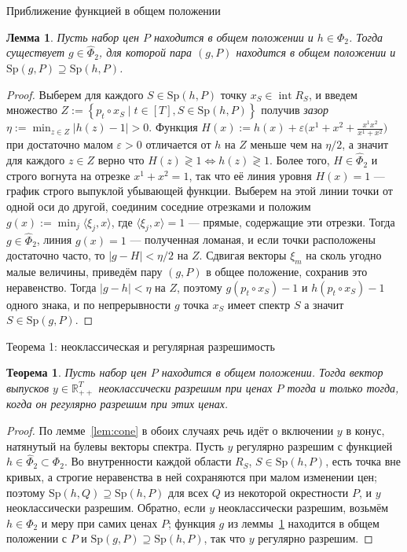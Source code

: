 \documentclass[10pt,aspectratio=169]{beamer}
\theoremstyle{plain}
\newtheorem{thm}{Теорема}
\newtheorem{lem}{Лемма}
\theoremstyle{definition}
\newcommand{\R}{\mathbb{R}}
\newcommand{\abs}[1]{\left\lvert #1 \right\rvert}
\newcommand{\set}[1]{\left\{ #1 \right\}}
\newcommand{\ip}[2]{\langle #1, #2\rangle}
\newcommand{\Rpp}[1][2]{\R^{#1}_{++}}
\begin{document}
\begin{frame}{Приближение функцией в общем положении}
    \begin{lem}\label{lem:approx}
        Пусть набор цен $P$ находится в общем положении и $h\in\Phi_2$. Тогда существует
        $g\in\hat\Phi_2$, для которой пара $(g,P)$ находится в общем положении и
        $\mathrm{Sp}(g,P)\supseteq\mathrm{Sp}(h,P)$.
    \end{lem}

    \begin{proof}
        Выберем для каждого $S\in\mathrm{Sp}(h,P)$ точку $x_S\in\operatorname{int} R_S$, и введем множество $Z:=\set{p_t\circ x_S \mid t\in[T],S\in\mathrm{Sp}(h,P)}$ получив \textit{зазор} $\eta:=\min_{z\in Z}\abs{h(z)-1}>0$. Функция $H(x):=h(x)+\varepsilon\bigl(x^1+x^2+\tfrac{x^1x^2}{x^1+x^2}\bigr)$ при достаточно малом $\varepsilon>0$ отличается от $h$ на $Z$ меньше чем на $\eta/2$, а значит для каждого $z\in Z$ верно что $H(z)\gtrless1\Leftrightarrow h(z)\gtrless1$. Более того, $H\in\hat\Phi_2$ и строго вогнута на отрезке $x^1+x^2=1$, так что её линия уровня $H(x)=1$ --- график строго выпуклой убывающей функции. Выберем на этой линии точки от одной оси до другой, соединим соседние отрезками и положим $g(x):=\min_j\ip{\xi_j}{x}$, где $\ip{\xi_j}{x}=1$ --- прямые, содержащие эти отрезки. Тогда $g\in\hat\Phi_2$, линия $g(x)=1$ --- полученная ломаная, и если точки расположены достаточно часто, то $\abs{g-H}<\eta/2$ на $Z$. Сдвигая векторы $\xi_m$ на сколь угодно малые величины, приведём пару $(g,P)$ в общее положение, сохранив это неравенство. Тогда $\abs{g-h}<\eta$ на $Z$, поэтому $g(p_t\circ x_S)-1$ и $h(p_t\circ x_S)-1$ одного знака, и по непрерывности $g$ точка $x_S$ имеет спектр $S$ а значит $S\in\mathrm{Sp}(g,P)$.
    \end{proof}
\end{frame}

\begin{frame}{Теорема 1: неоклассическая и регулярная разрешимость}
    \begin{thm}\label{thm:regular}
        Пусть набор цен $P$ находится в общем положении. Тогда вектор выпусков $y\in\Rpp[T]$
        неоклассически разрешим при ценах $P$ тогда и только тогда, когда он регулярно разрешим
        при этих ценах.
    \end{thm}

    \begin{proof}
        По лемме~\ref{lem:cone} в обоих случаях речь идёт о включении $y$ в конус, натянутый на булевы векторы спектра. Пусть $y$ регулярно разрешим с функцией $h\in\hat\Phi_2\subset\Phi_2$. Во внутренности каждой области $R_S$, $S\in\mathrm{Sp}(h,P)$, есть точка вне кривых, а строгие неравенства в ней сохраняются при малом изменении цен; поэтому $\mathrm{Sp}(h,Q)\supseteq\mathrm{Sp}(h,P)$ для всех $Q$ из некоторой окрестности $P$, и $y$ неоклассически разрешим. Обратно, если $y$ неоклассически разрешим, возьмём $h\in\Phi_2$ и меру при самих ценах $P$; функция $g$ из леммы~\ref{lem:approx} находится в общем положении с $P$ и $\mathrm{Sp}(g,P)\supseteq\mathrm{Sp}(h,P)$, так что $y$ регулярно разрешим.
    \end{proof}
\end{frame}
\end{document}
